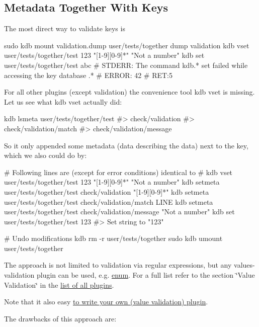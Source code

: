 \subsection*{Metadata Together With Keys}

The most direct way to validate keys is


\begin{DoxyCode}
sudo kdb mount validation.dump user/tests/together dump validation
kdb vset user/tests/together/test 123 "[1-9][0-9]*" "Not a number"
kdb set user/tests/together/test abc
# STDERR: The command kdb.* set failed while accessing the key database .*
# ERROR:  42
# RET:5
\end{DoxyCode}


For all other plugins (except {\ttfamily validation}) the convenience tool {\ttfamily kdb vset} is missing. Let us see what {\ttfamily kdb vset} actually did\+:


\begin{DoxyCode}
kdb lsmeta user/tests/together/test
#> check/validation
#> check/validation/match
#> check/validation/message
\end{DoxyCode}


So it only appended some metadata (data describing the data) next to the key, which we also could do by\+:


\begin{DoxyCode}
# Following lines are (except for error conditions) identical to
# kdb vset user/tests/together/test 123 "[1-9][0-9]*" "Not a number"
kdb setmeta user/tests/together/test check/validation "[1-9][0-9]*"
kdb setmeta user/tests/together/test check/validation/match LINE
kdb setmeta user/tests/together/test check/validation/message "Not a number"
kdb set user/tests/together/test 123
#> Set string to "123"

# Undo modifications
kdb rm -r user/tests/together
sudo kdb umount user/tests/together
\end{DoxyCode}


The approach is not limited to validation via regular expressions, but any values-\/validation plugin can be used, e.\+g. \hyperlink{md_src_plugins_enum_README_src_plugins_enum_README_md}{enum}. For a full list refer to the section \char`\"{}\+Value Validation\char`\"{} in the \hyperlink{md_src_plugins_README_src_plugins_README_md}{list of all plugins}.

Note that it also easy \hyperlink{doc_tutorials_plugins_md}{to write your own (value validation) plugin}.

The drawbacks of this approach are\+:


